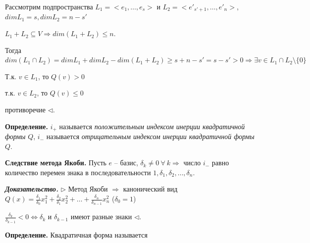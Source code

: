 Рассмотрим подпространства $L_1 = <e_1, \dots, e_s>$ и $L_2 = <e'_{s'+1}, \dots, e'_n>$, $dimL_1 = s, dimL_2 = n-s'$

$L_1 + L_2 \subseteq V \Rightarrow dim (L_1 + L_2) \leq n$.

Тогда $dim(L_1 \cap L_2) = dimL_1 + dimL_2 - dim(L_1 + L_2) \geq s + n - s' = s - s'> 0 \Rightarrow \exists v \in L_1 \cap L_2 \setminus \{0\} $

Т.к. $v \in L_1$, то $Q(v) > 0$

т.к. $v \in L_2$, то $Q(v) \leq 0$

противоречие $\lhd$.

\vspace{\baselineskip}
\textbf{Определение.} $i_+$ называется \textit{положительным индексом инерции квадратичной формы} $Q$, $i_-$ называется \textit{отрицательным индексом инерции квадратичной формы} $Q$.

\vspace{\baselineskip}
\textbf{Следствие метода Якоби.} Пусть $e$ -- базис, $\delta_k \neq 0 \ \forall \ k \Rightarrow$ число $i_-$ равно количество перемен знака в последовательности $1, \delta_1, \delta_2, \dots, \delta_n$.

\vspace{\baselineskip}
\textbf{\textit{Доказательство.}} $\rhd$ Метод Якоби $\Rightarrow$ канонический вид $Q(x) = \frac{\delta_1}{\delta_0} x_1^2 + \frac{\delta_2}{\delta_1} x_2^2 + \dots + \frac{\delta_n}{\delta_{n-1}} x_n^2$ ($\delta_0 = 1$)

$\frac{\delta_k}{\delta_{k-1}} < 0 \Leftrightarrow \delta_k$ и $\delta_{k-1}$ имеют разные знаки $\lhd$.

\vspace{\baselineskip}
\textbf{Определение.} Квадратичная форма называется 

